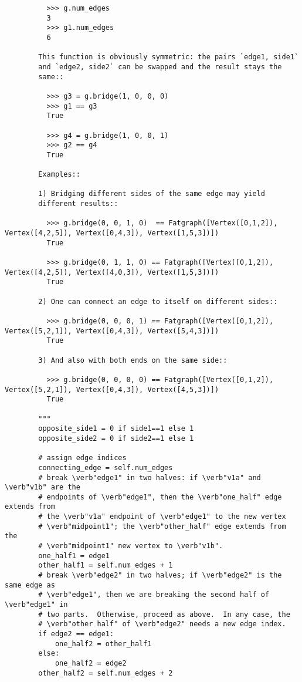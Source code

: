 \begin{lstlisting}
          >>> g.num_edges
          3
          >>> g1.num_edges
          6
          
        This function is obviously symmetric: the pairs `edge1, side1`
        and `edge2, side2` can be swapped and the result stays the
        same::

          >>> g3 = g.bridge(1, 0, 0, 0)
          >>> g1 == g3
          True

          >>> g4 = g.bridge(1, 0, 0, 1)
          >>> g2 == g4
          True

        Examples::
        
        1) Bridging different sides of the same edge may yield
        different results::
        
          >>> g.bridge(0, 0, 1, 0)  == Fatgraph([Vertex([0,1,2]), Vertex([4,2,5]), Vertex([0,4,3]), Vertex([1,5,3])])
          True
          
          >>> g.bridge(0, 1, 1, 0) == Fatgraph([Vertex([0,1,2]), Vertex([4,2,5]), Vertex([4,0,3]), Vertex([1,5,3])])
          True

        2) One can connect an edge to itself on different sides::
        
          >>> g.bridge(0, 0, 0, 1) == Fatgraph([Vertex([0,1,2]), Vertex([5,2,1]), Vertex([0,4,3]), Vertex([5,4,3])])
          True

        3) And also with both ends on the same side::
        
          >>> g.bridge(0, 0, 0, 0) == Fatgraph([Vertex([0,1,2]), Vertex([5,2,1]), Vertex([0,4,3]), Vertex([4,5,3])])
          True
          
        """
        opposite_side1 = 0 if side1==1 else 1
        opposite_side2 = 0 if side2==1 else 1

        # assign edge indices
        connecting_edge = self.num_edges
        # break \verb"edge1" in two halves: if \verb"v1a" and \verb"v1b" are the
        # endpoints of \verb"edge1", then the \verb"one_half" edge extends from
        # the \verb"v1a" endpoint of \verb"edge1" to the new vertex
        # \verb"midpoint1"; the \verb"other_half" edge extends from the
        # \verb"midpoint1" new vertex to \verb"v1b".
        one_half1 = edge1
        other_half1 = self.num_edges + 1
        # break \verb"edge2" in two halves; if \verb"edge2" is the same edge as
        # \verb"edge1", then we are breaking the second half of \verb"edge1" in
        # two parts.  Otherwise, proceed as above.  In any case, the
        # \verb"other half" of \verb"edge2" needs a new edge index.
        if edge2 == edge1:
            one_half2 = other_half1
        else:
            one_half2 = edge2
        other_half2 = self.num_edges + 2


\end{lstlisting}
